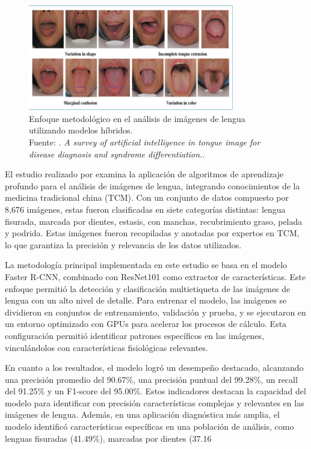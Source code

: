 \begin{figure}[H]
	\begin{center}
		\includegraphics[width=0.80\textwidth]{2/figures/4.jpeg}
		\caption[Enfoque metodológico en el análisis de imágenes de lengua]{Enfoque metodológico en el análisis de imágenes de lengua utilizando modelos híbridos. \\
		Fuente: \cite{Liu2023}. \textit{A survey of artificial intelligence in tongue image for disease diagnosis and syndrome differentiation.}.}
		\label{2:fig126}
	\end{center}
\end{figure}

El estudio realizado por \cite{Jiang2022} examina la aplicación de algoritmos de aprendizaje profundo para el análisis de imágenes de lengua, integrando conocimientos de la medicina tradicional china (TCM). Con un conjunto de datos compuesto por 8,676 imágenes, estas fueron clasificadas en siete categorías distintas: lengua fisurada, marcada por dientes, estasis, con manchas, recubrimiento graso, pelada y podrida. Estas imágenes fueron recopiladas y anotadas por expertos en TCM, lo que garantiza la precisión y relevancia de los datos utilizados.  

La metodología principal implementada en este estudio se basa en el modelo Faster R-CNN, combinado con ResNet101 como extractor de características. Este enfoque permitió la detección y clasificación multietiqueta de las imágenes de lengua con un alto nivel de detalle. Para entrenar el modelo, las imágenes se dividieron en conjuntos de entrenamiento, validación y prueba, y se ejecutaron en un entorno optimizado con GPUs para acelerar los procesos de cálculo. Esta configuración permitió identificar patrones específicos en las imágenes, vinculándolos con características fisiológicas relevantes.  

En cuanto a los resultados, el modelo logró un desempeño destacado, alcanzando una precisión promedio del 90.67\%, una precisión puntual del 99.28\%, un recall del 91.25\% y un F1-score del 95.00\%. Estos indicadores destacan la capacidad del modelo para identificar con precisión características complejas y relevantes en las imágenes de lengua. Además, en una aplicación diagnóstica más amplia, el modelo identificó características específicas en una población de análisis, como lenguas fisuradas (41.49\%), marcadas por dientes (37.16%

